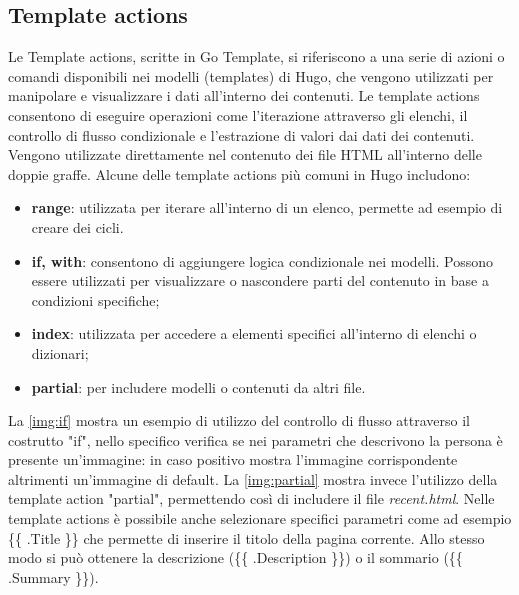 \documentclass[target=bach,aauheader=]{thud}
\begin{document}
\subsection{Template actions}\label{sec:tactions}
Le Template actions, scritte in Go Template, si riferiscono a una serie di azioni o comandi disponibili nei modelli (templates) di Hugo, che vengono utilizzati per manipolare e visualizzare i dati all'interno dei contenuti. 
Le template actions consentono di eseguire operazioni come l'iterazione attraverso gli elenchi, il controllo di flusso condizionale e l'estrazione di valori dai dati dei contenuti. Vengono utilizzate direttamente nel contenuto dei file HTML all'interno delle doppie graffe. \newline
Alcune delle template actions più comuni in Hugo includono:
\begin{itemize}
    \item \textbf{range}: utilizzata per iterare all'interno di un elenco, permette ad esempio di creare dei cicli.
    \item \textbf{if, with}: consentono di aggiungere logica condizionale nei modelli. Possono essere utilizzati per visualizzare o nascondere parti del contenuto in base a condizioni specifiche;
    \item \textbf{index}: utilizzata per accedere a elementi specifici all'interno di elenchi o dizionari;
    \item \textbf{partial}: per includere modelli o contenuti da altri file. 
\end{itemize}

La \cref{img:if} mostra un esempio di utilizzo del controllo di flusso attraverso il costrutto "if", nello specifico verifica se nei parametri che descrivono la persona è presente un'immagine: in caso positivo mostra l'immagine corrispondente altrimenti un'immagine di default.
La \cref{img:partial} mostra invece l'utilizzo della template action "partial", permettendo così di includere il file \textit{recent.html}. \newline 
Nelle template actions è possibile anche selezionare specifici parametri come ad esempio \{\{ .Title \}\} che permette di inserire il titolo della pagina corrente. Allo stesso modo si può ottenere la descrizione (\{\{ .Description \}\}) o il sommario (\{\{ .Summary \}\}).
\end{document}

